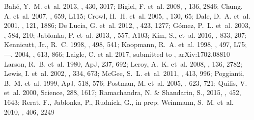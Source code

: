 \documentclass[11pt]{article}
\begin{document}
\footnotesize{{Bah\'e}, Y.~M. {et~al.} 2013, \mnras, 430, 3017; 
{Bigiel}, F. {et~al.} 2008, \aj, 136, 2846; 
{Chung}, A. {et~al.} 2007, \apjl, 659, L115; 
{Crowl}, H.~H. {et~al.} 2005, \aj, 130, 65; 
{Dale}, D.~A. {et~al.} 2001, \aj, 121, 1886; 
{De Lucia}, G. {et~al.} 2012, \mnras, 423, 1277; 
{G{\' o}mez}, P.~L. {et~al.} 2003, \apj, 584, 210; 
{Jablonka}, P. {et~al.} 2013, \aap, 557, A103; 
{Kim}, S., et~al. 2016, \apj, 833, 207;
{Kennicutt}, Jr., R.~C. 1998, \apj, 498, 541; 
{Koopmann}, R.~A. {et~al.} 1998, \apjl, 497, L75; 
---. 2004, \apj, 613, 866; 
Laigle, C. et al. 2017, submitted to \mnras, arXiv:1702.08810
{Larson}, R.~B. {et~al.} 1980, ApJ, 237, 692; 
{Leroy}, A.~K. {et~al.} 2008, \aj, 136, 2782; 
{Lewis}, I. {et~al.} 2002, \mnras, 334, 673; 
{McGee}, S.~L. {et~al.} 2011, \mnras, 413, 996; 
{Poggianti}, B.~M. {et~al.} 1999, ApJ, 518, 576; 
{Postman}, M. {et~al.} 2005, \apj, 623, 721; 
{Quilis}, V. {et~al.} 2000, Science, 288, 1617; 
{Ramachandra}, N. \& {Shandarin}, S., 2015, \mnras, 452, 1643;
{Rerat}, F., Jablonka, P., Rudnick, G., in prep;
{Weinmann}, S.~M. {et~al.} 2010, \mnras, 406, 2249}





\end{document}
